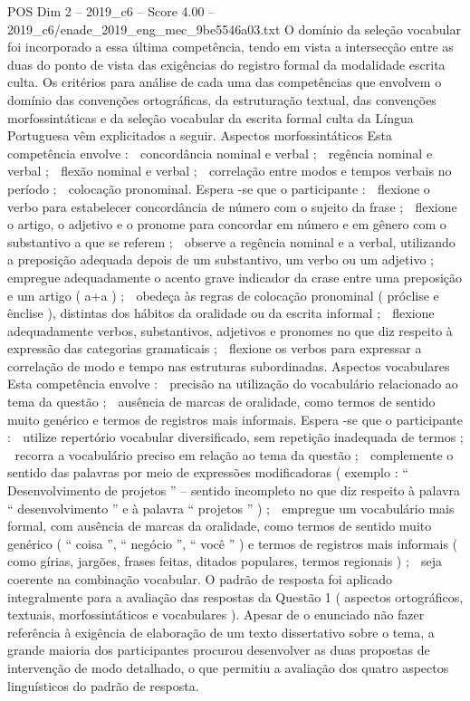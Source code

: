 \begin{textsample}{POS Dim 2 – 2019\_c6 – Score 4.00 – 2019\_c6/enade\_2019\_eng\_mec\_9be5546a03.txt}
O domínio da seleção vocabular foi incorporado a essa última competência, tendo em vista a intersecção entre as duas do ponto de vista das exigências do registro formal da modalidade escrita culta.
Os critérios para análise de cada uma das competências que envolvem o domínio das convenções ortográficas, da estruturação textual, das convenções morfossintáticas e da seleção vocabular da escrita formal culta da Língua Portuguesa vêm explicitados a seguir.
Aspectos morfossintáticos Esta competência envolve :  concordância nominal e verbal ;  regência nominal e verbal ;  flexão nominal e verbal ;  correlação entre modos e tempos verbais no período ;  colocação pronominal.
Espera -se que o participante :  flexione o verbo para estabelecer concordância de número com o sujeito da frase ;  flexione o artigo, o adjetivo e o pronome para concordar em número e em gênero com o substantivo a que se referem ;  observe a regência nominal e a verbal, utilizando a preposição adequada depois de um substantivo, um verbo ou um adjetivo ;  empregue adequadamente o acento grave indicador da crase entre uma preposição e um artigo ( a+a ) ;  obedeça às regras de colocação pronominal ( próclise e ênclise ), distintas dos hábitos da oralidade ou da escrita informal ;  flexione adequadamente verbos, substantivos, adjetivos e pronomes no que diz respeito à expressão das categorias gramaticais ;  flexione os verbos para expressar a correlação de modo e tempo nas estruturas subordinadas.
Aspectos vocabulares Esta competência envolve :  precisão na utilização do vocabulário relacionado ao tema da questão ;  ausência de marcas de oralidade, como termos de sentido muito genérico e termos de registros mais informais.
Espera -se que o participante :  utilize repertório vocabular diversificado, sem repetição inadequada de termos ;  recorra a vocabulário preciso em relação ao tema da questão ;  complemente o sentido das palavras por meio de expressões modificadoras ( exemplo : “ Desenvolvimento de projetos ” – sentido incompleto no que diz respeito à palavra “ desenvolvimento ” e à palavra “ projetos ” ) ;  empregue um vocabulário mais formal, com ausência de marcas da oralidade, como termos de sentido muito genérico ( “ coisa ”, “ negócio ”, “ você ” ) e termos de registros mais informais ( como gírias, jargões, frases feitas, ditados populares, termos regionais ) ;  seja coerente na combinação vocabular.
O padrão de resposta foi aplicado integralmente para a avaliação das respostas da Questão 1 ( aspectos ortográficos, textuais, morfossintáticos e vocabulares ).
Apesar de o enunciado não fazer referência à exigência de elaboração de um texto dissertativo sobre o tema, a grande maioria dos participantes procurou desenvolver as duas propostas de intervenção de modo detalhado, o que permitiu a avaliação dos quatro aspectos linguísticos do padrão de resposta.

\end{textsample}
